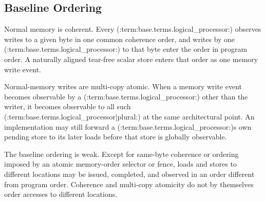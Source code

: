 \subsection{Baseline Ordering}
Normal memory is coherent. Every (:term:base.terms.logical_processor:) observes writes to a given byte in one common coherence order, and
writes by one (:term:base.terms.logical_processor:) to that byte enter the order in program order. A naturally aligned tear-free scalar
store enters that order as one memory write event.

Normal-memory writes are multi-copy atomic. When a memory write event becomes observable by a (:term:base.terms.logical_processor:) other than
the writer, it becomes observable to all such (:term:base.terms.logical_processor|plural:) at the same architectural point. An implementation may still
forward a (:term:base.terms.logical_processor:)\textquotesingle{}s own pending store to its later loads before that store is globally observable.

The baseline ordering is weak. Except for same-byte coherence or ordering imposed by an atomic memory-order selector
or fence, loads and stores to different locations may be issued, completed, and observed in an order different from
program order. Coherence and multi-copy atomicity do not by themselves order accesses to different locations.
